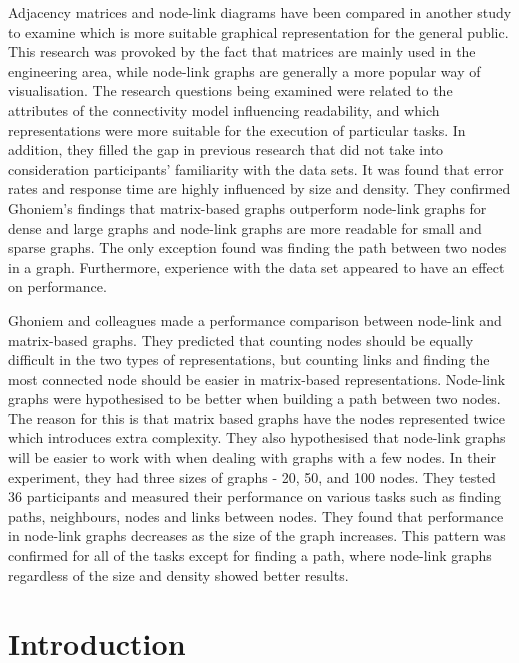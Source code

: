 \documentclass{l4proj}
\begin{document}
Adjacency matrices and node-link diagrams have been compared in another study \cite{keller2006matrices} to examine which is more suitable graphical representation for the general public. This research was provoked by the fact that matrices are mainly used in the engineering area, while node-link graphs are generally a more popular way of visualisation. The research questions being examined were related to the attributes of the connectivity model influencing readability, and which representations were more suitable for the execution of particular tasks. In addition, they filled the gap in previous research that did not take into consideration participants' familiarity with the data sets. It was found that error rates and response time are highly influenced by size and density. They confirmed Ghoniem's \cite{ghoniem2004comparison} findings that matrix-based graphs outperform node-link graphs for dense and large graphs and node-link graphs are more readable for small and sparse graphs. The only exception found was finding the path between two nodes in a graph. Furthermore, experience with the data set appeared to have an effect on performance. 

Ghoniem and colleagues \cite{ghoniem2004comparison} made a performance comparison between node-link and matrix-based graphs. They predicted that counting nodes should be equally difficult in the two types of representations, but counting links and finding the most connected node should be easier in matrix-based representations. Node-link graphs were hypothesised to be better when building a path between two nodes. The reason for this is that matrix based graphs have the nodes represented twice which introduces extra complexity. They also hypothesised that node-link graphs will be easier to work with when dealing with graphs with a few nodes. In their experiment, they had three sizes of graphs - 20, 50, and 100 nodes. They tested 36 participants and measured their performance on various tasks such as finding paths, neighbours, nodes and links between nodes. They found that performance in node-link graphs decreases as the size of the graph increases. This pattern was confirmed for all of the tasks except for finding a path, where node-link graphs regardless of the size and density showed better results.

\chapter{Introduction}
\end{document}
